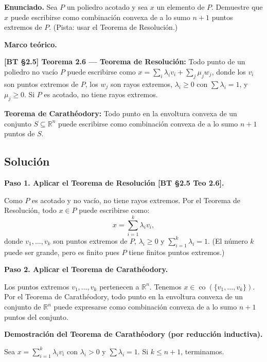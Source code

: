 \documentclass{article}
\newenvironment{marco}{\begin{mdframed}[linecolor=black!40,backgroundcolor=gray!5]\small\textbf{Marco teórico.}\par\smallskip}{\end{mdframed}\medskip}
\begin{document}
\textbf{Enunciado.} Sea $P$ un poliedro acotado y sea $x$ un elemento de $P$. Demuestre que $x$ puede escribirse como combinación convexa de a lo sumo $n+1$ puntos extremos de $P$. (Pista: usar el Teorema de Resolución.)

\begin{marco}
\textbf{[BT §2.5] Teorema 2.6 — Teorema de Resolución:} Todo punto de un poliedro no vacío $P$ puede escribirse como $x = \sum_i \lambda_i v_i + \sum_j \mu_j w_j$, donde los $v_i$ son puntos extremos de $P$, los $w_j$ son rayos extremos, $\lambda_i \geq 0$ con $\sum \lambda_i = 1$, y $\mu_j \geq 0$. Si $P$ es acotado, no tiene rayos extremos.

\textbf{Teorema de Carathéodory:} Todo punto en la envoltura convexa de un conjunto $S \subseteq \mathbb{R}^n$ puede escribirse como combinación convexa de a lo sumo $n+1$ puntos de $S$.
\end{marco}

\subsection*{Solución}

\textbf{Paso 1. Aplicar el Teorema de Resolución [BT §2.5 Teo 2.6].}

Como $P$ es acotado y no vacío, no tiene rayos extremos. Por el Teorema de Resolución, todo $x \in P$ puede escribirse como:
\[
  x = \sum_{i=1}^{k} \lambda_i v_i,
\]
donde $v_1, \ldots, v_k$ son puntos extremos de $P$, $\lambda_i \geq 0$ y $\sum_{i=1}^k \lambda_i = 1$. (El número $k$ puede ser grande, pero es finito pues $P$ tiene finitos puntos extremos.)

\textbf{Paso 2. Aplicar el Teorema de Carathéodory.}

Los puntos extremos $v_1, \ldots, v_k$ pertenecen a $\mathbb{R}^n$. Tenemos $x \in \operatorname{co}(\{v_1, \ldots, v_k\})$. Por el Teorema de Carathéodory, todo punto en la envoltura convexa de un conjunto de $\mathbb{R}^n$ puede expresarse como combinación convexa de a lo sumo $n+1$ puntos del conjunto.

\textbf{Demostración del Teorema de Carathéodory (por reducción inductiva).}

Sea $x = \sum_{i=1}^{k} \lambda_i v_i$ con $\lambda_i > 0$ y $\sum \lambda_i = 1$. Si $k \leq n+1$, terminamos.
\end{document}
